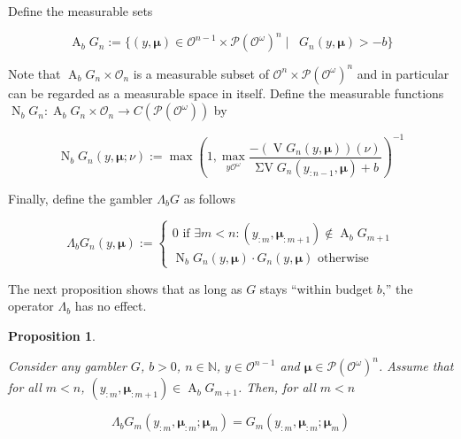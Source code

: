 \documentclass[11pt]{article}
\theoremstyle{definition}
\theoremstyle{plain}
\newtheorem{proposition}{Proposition}%
\newcommand{\Nats}{\mathbb{N}}
\newcommand{\PM}{\mathcal{P}}
\newcommand{\Ob}{\mathcal{O}}
\newcommand{\OO}{\Ob^\omega}
\newcommand{\PMO}{\PM(\OO)}
\DeclareMathOperator{\V}{V}
\DeclareMathOperator{\SV}{\Sigma V}
\DeclareMathOperator{\SVM}{\Sigma V_{\min}}
\DeclareMathOperator{\Ab}{A}
\DeclareMathOperator{\Nr}{N}
\newcommand{\Bd}{\Lambda}
\newcommand{\BM}{\bm{\mu}}
\begin{document}
Define the measurable sets

\begin{equation}
\Ab_b G_n:=\{(y,\BM) \in \Ob^{n-1} \times \PMO^n \mid \SVM G_n(y,\BM) > -b\}
\end{equation}

Note that $\Ab_b G_n \times \Ob_n$ is a measurable subset of $\Ob^n \times \PMO^n$ and in particular can be regarded as a measurable space in itself. Define the measurable functions $\Nr_b G_n: \Ab_b G_n \times \Ob_n \rightarrow C(\PMO)$ by

\begin{equation}
\Nr_b G_n(y,\BM;\nu):=\max(1,\max_{y\OO} \frac{-(\V G_n(y,\BM))(\nu)}{\SV G_n(y_{:n-1},\BM)+b})^{-1}
\end{equation}

Finally, define the gambler $\Bd_b G$ as follows

\begin{equation}
\Bd_b G_n(y,\BM):=\begin{cases} 0 \text{ if } \exists m < n: (y_{:m},\BM_{:m+1}) \not\in \Ab_b G_{m+1} \\ \Nr_b G_n(y,\BM) \cdot G_n(y, \BM) \text{ otherwise} \end{cases}
\end{equation}

The next proposition shows that as long as $G$ stays \enquote{within budget $b$,} the operator $\Bd_b$ has no effect. 

\begin{proposition}
\label{prp:b_no_effect}

Consider any gambler $G$, $b > 0$, $n \in \Nats$, $y \in \Ob^{n - 1}$ and $\BM \in \PMO^n$. Assume that for all $m < n$, $(y_{:m},\BM_{:m+1}) \in \Ab_b G_{m+1}$. Then, for all $m < n$

\begin{equation}
\Bd_b G_m(y_{:m},\BM_{:m};\BM_m)=G_m(y_{:m},\BM_{:m};\BM_m)
\end{equation}

\end{proposition}
\end{document}
